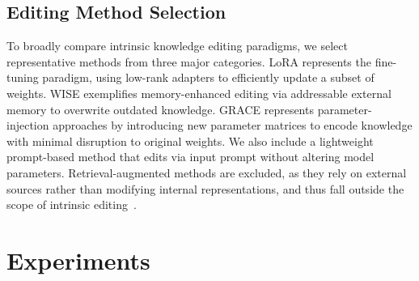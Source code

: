 \documentclass[letterpaper]{article} %
\begin{document}



\subsection{Editing Method Selection}
To broadly compare intrinsic knowledge editing paradigms, we select representative methods from three major categories. LoRA represents the fine-tuning paradigm, using low-rank adapters to efficiently update a subset of weights. WISE exemplifies memory-enhanced editing via addressable external memory to overwrite outdated knowledge. GRACE represents parameter-injection approaches by introducing new parameter matrices to encode knowledge with minimal disruption to original weights. We also include a lightweight prompt-based method that edits via input prompt without altering model parameters. Retrieval-augmented methods are excluded, as they rely on external sources rather than modifying internal representations, and thus fall outside the scope of intrinsic editing~\citep{song2024blackbox,shi2024retrieval,chen2024lifelong,zheng2023incontext}.




\section{Experiments}
\end{document}
